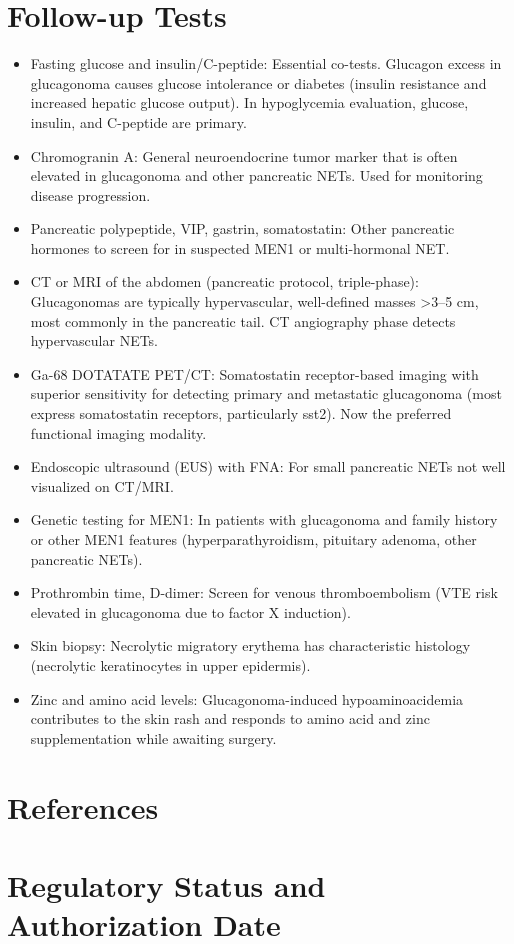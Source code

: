 \section*{Follow-up Tests}
\begin{itemize}
  \item Fasting glucose and insulin/C-peptide: Essential co-tests. Glucagon excess in glucagonoma causes glucose intolerance or diabetes (insulin resistance and increased hepatic glucose output). In hypoglycemia evaluation, glucose, insulin, and C-peptide are primary.
  \item Chromogranin A: General neuroendocrine tumor marker that is often elevated in glucagonoma and other pancreatic NETs. Used for monitoring disease progression.
  \item Pancreatic polypeptide, VIP, gastrin, somatostatin: Other pancreatic hormones to screen for in suspected MEN1 or multi-hormonal NET.
  \item CT or MRI of the abdomen (pancreatic protocol, triple-phase): Glucagonomas are typically hypervascular, well-defined masses >3--5 cm, most commonly in the pancreatic tail. CT angiography phase detects hypervascular NETs.
  \item Ga-68 DOTATATE PET/CT: Somatostatin receptor-based imaging with superior sensitivity for detecting primary and metastatic glucagonoma (most express somatostatin receptors, particularly sst2). Now the preferred functional imaging modality.
  \item Endoscopic ultrasound (EUS) with FNA: For small pancreatic NETs not well visualized on CT/MRI.
  \item Genetic testing for MEN1: In patients with glucagonoma and family history or other MEN1 features (hyperparathyroidism, pituitary adenoma, other pancreatic NETs).
  \item Prothrombin time, D-dimer: Screen for venous thromboembolism (VTE risk elevated in glucagonoma due to factor X induction).
  \item Skin biopsy: Necrolytic migratory erythema has characteristic histology (necrolytic keratinocytes in upper epidermis).
  \item Zinc and amino acid levels: Glucagonoma-induced hypoaminoacidemia contributes to the skin rash and responds to amino acid and zinc supplementation while awaiting surgery.
\end{itemize}

\section*{References}



\clearpage
\section*{Regulatory Status and Authorization Date}

\clearpage

